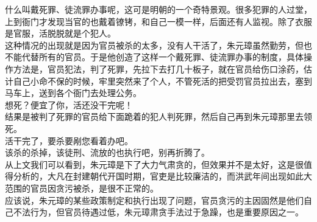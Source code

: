 \begin{multicols}{\theparacolNo}
什么叫戴死罪、徒流罪办事呢，这可是明朝的一个奇特景观。很多犯罪的人过堂，上到衙门才发现当官的也戴着镣铐，和自己一模一样，后面还有人监视。除了衣服是官服，活脱脱就是个犯人。\\

这种情况的出现就是因为官员被杀的太多，没有人干活了，朱元璋虽然勤劳，但也不能代替所有的官员。于是他创造了这样一个戴死罪、徒流罪办事的制度，具体操作方法是，官员犯法，判了死罪，先拉下去打几十板子，就在官员给伤口涂药，估计自己小命不保的时候，牢里突然来了个人，不管死活的把受罚官员拉出去，塞到马车上，送到各个衙门去处理公务。\\

想死？便宜了你，活还没干完呢！\\

结果是被判了死罪的官员给下面跪着的犯人判死罪，然后自己再到朱元璋那里去领死。\\

活干完了，要杀要剐您看着办吧。\\

该杀的杀掉，该徒刑、流放的也执行吧，别再折腾了。\\

从上文我们可以看到，朱元璋是下了大力气肃贪的，但效果并不是太好，这是很值得分析的，大凡在封建朝代开国时期，官吏是比较廉洁的，而洪武年间出现如此大范围的官员因贪污被杀，是很不正常的。\\

应该说，朱元璋的某些政策制定和执行出现了问题，官员贪污的主因固然是他们自己不法行为，但官员待遇过低，朱元璋肃贪手法过于急躁，也是重要原因之一。\\
\ifnum{}
	\end{multicols}
\fi
\newpage
